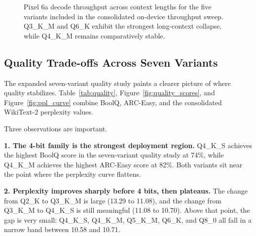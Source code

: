 \documentclass{article}
\begin{document}
\begin{figure}[t]
\centering
{}
\caption{Pixel 6a decode throughput across context lengths for the five variants included in the consolidated on-device throughput sweep. Q3\_K\_M and Q6\_K exhibit the strongest long-context collapse, while Q4\_K\_M remains comparatively stable.}
\label{fig:pixel_tps}
\end{figure}

\subsection{Quality Trade-offs Across Seven Variants}

The expanded seven-variant quality study paints a clearer picture of where quality stabilizes. Table~\ref{tab:quality}, Figure~\ref{fig:quality_scores}, and Figure~\ref{fig:ppl_curve} combine BoolQ, ARC-Easy, and the consolidated WikiText-2 perplexity values.

Three observations are important.

\textbf{1. The 4-bit family is the strongest deployment region.} Q4\_K\_S achieves the highest BoolQ score in the seven-variant quality study at 74\%, while Q4\_K\_M achieves the highest ARC-Easy score at 82\%. Both variants sit near the point where the perplexity curve flattens.

\textbf{2. Perplexity improves sharply before 4 bits, then plateaus.} The change from Q2\_K to Q3\_K\_M is large (13.29 to 11.08), and the change from Q3\_K\_M to Q4\_K\_S is still meaningful (11.08 to 10.70). Above that point, the gap is very small: Q4\_K\_S, Q4\_K\_M, Q5\_K\_M, Q6\_K, and Q8\_0 all fall in a narrow band between 10.58 and 10.71.
\end{document}
